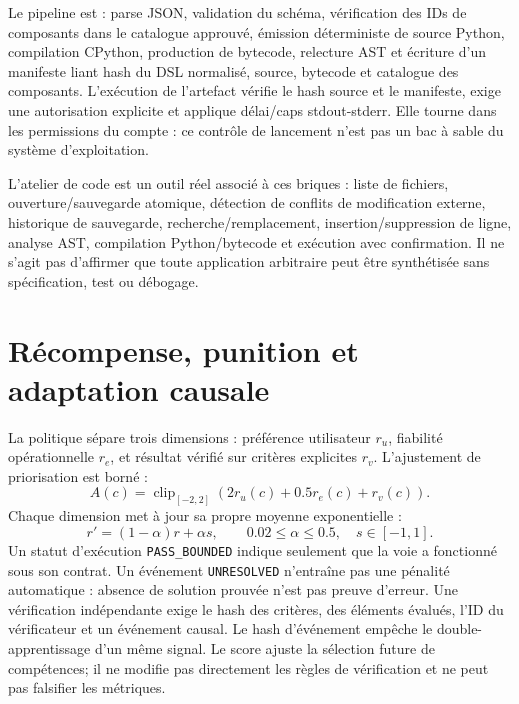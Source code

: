 \documentclass[11pt,a4paper]{article}
\begin{document}
Le pipeline est : parse JSON, validation du schéma, vérification des IDs de composants dans le catalogue approuvé, émission déterministe de source Python, compilation CPython, production de bytecode, relecture AST et écriture d'un manifeste liant hash du DSL normalisé, source, bytecode et catalogue des composants. L'exécution de l'artefact vérifie le hash source et le manifeste, exige une autorisation explicite et applique délai/caps stdout-stderr. Elle tourne dans les permissions du compte : ce contrôle de lancement n'est pas un bac à sable du système d'exploitation.

L'atelier de code est un outil réel associé à ces briques : liste de fichiers, ouverture/sauvegarde atomique, détection de conflits de modification externe, historique de sauvegarde, recherche/remplacement, insertion/suppression de ligne, analyse AST, compilation Python/bytecode et exécution avec confirmation. Il ne s'agit pas d'affirmer que toute application arbitraire peut être synthétisée sans spécification, test ou débogage.

\section{Récompense, punition et adaptation causale}
La politique sépare trois dimensions : préférence utilisateur \(r_u\), fiabilité opérationnelle \(r_e\), et résultat vérifié sur critères explicites \(r_v\). L'ajustement de priorisation est borné :
\[
  A(c)=\operatorname{clip}_{[-2,2]}(2r_u(c)+0.5r_e(c)+r_v(c)).
\]
Chaque dimension met à jour sa propre moyenne exponentielle :
\[
  r'=(1-\alpha)r+\alpha s,\qquad 0.02\leq \alpha\leq 0.5,\quad s\in[-1,1].
\]
Un statut d'exécution \texttt{PASS\_BOUNDED} indique seulement que la voie a fonctionné sous son contrat. Un événement \texttt{UNRESOLVED} n'entraîne pas une pénalité automatique : absence de solution prouvée n'est pas preuve d'erreur. Une vérification indépendante exige le hash des critères, des éléments évalués, l'ID du vérificateur et un événement causal. Le hash d'événement empêche le double-apprentissage d'un même signal. Le score ajuste la sélection future de compétences; il ne modifie pas directement les règles de vérification et ne peut pas falsifier les métriques.
\end{document}
